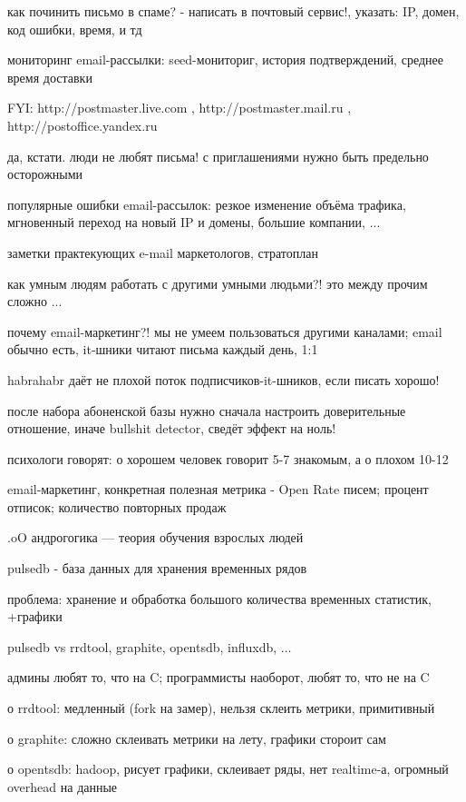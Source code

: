   \item как починить письмо в спаме? - написать в почтовый сервис!, указать: IP, домен, код ошибки, время, и тд
  \item мониторинг email-рассылки: seed-мониториг, история подтверждений, среднее время доставки
  \item FYI: http://postmaster.live.com , http://postmaster.mail.ru , http://postoffice.yandex.ru 
  \item да, кстати. люди не любят письма! с приглашениями нужно быть предельно осторожными
  \item популярные ошибки email-рассылок: резкое изменение объёма трафика, мгновенный переход на новый IP и домены, большие компании, ...
  \item заметки практекующих e-mail маркетологов, стратоплан
  \item как умным людям работать с другими умными людьми?! это между прочим сложно ...
  \item почему email-маркетинг?! мы не умеем пользоваться другими каналами; email обычно есть, it-шники читают письма каждый день, 1:1
  \item habrahabr даёт не плохой поток подписчиков-it-шников, если писать хорошо!
  \item после набора абоненской базы нужно сначала настроить доверительные отношение, иначе bullshit detector, сведёт эффект на ноль!
  \item психологи говорят: о хорошем человек говорит 5-7 знакомым, а о плохом 10-12
  \item email-маркетинг, конкретная полезная метрика - Open Rate писем; процент отписок; количество повторных продаж
  \item .oO андрогогика --- теория обучения взрослых людей
  \item pulsedb - база данных для хранения временных рядов
  \item проблема: хранение и обработка большого количества временных статистик, +графики
  \item pulsedb vs rrdtool, graphite, opentsdb, influxdb, ...
  \item админы любят то, что на C; программисты наоборот, любят то, что не на C
  \item о rrdtool: медленный (fork на замер), нельзя склеить метрики, примитивный
  \item о graphite: сложно склеивать метрики на лету, графики стороит сам
  \item о opentsdb: hadoop, рисует графики, склеивает ряды, нет realtime-а, огромный overhead на данные
